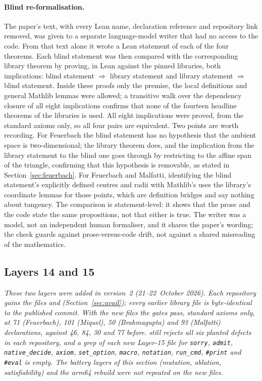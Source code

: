 \documentclass[11pt]{article}
\theoremstyle{definition}
\theoremstyle{remark}
\newcommand{\lean}[1]{\texttt{#1}}
\begin{document}
\paragraph{Blind re-formalisation.} The paper's text, with every Lean name, declaration
reference and repository link removed, was given to a separate language-model writer that had no
access to the code. From that text alone it wrote a Lean statement of each of the four theorems.
Each blind statement was then compared with the corresponding library theorem by proving, in Lean
against the pinned libraries, both implications: blind statement $\Rightarrow$ library statement
and library statement $\Rightarrow$ blind statement. Inside these proofs only the premise, the
local definitions and general Mathlib lemmas were allowed; a transitive walk over the dependency
closure of all eight implications confirms that none of the fourteen headline theorems of the
libraries is used. All eight implications were proved, from the standard axioms only, so all four
pairs are equivalent. Two points are worth recording. For Feuerbach the blind statement has no
hypothesis that the ambient space is two-dimensional; the library theorem does, and the implication
from the library statement to the blind one goes through by restricting to the affine span of the
triangle, confirming that this hypothesis is removable, as stated in Section~\ref{sec:feuerbach}.
For Feuerbach and Malfatti, identifying the blind statement's explicitly defined centres and radii
with Mathlib's uses the library's coordinate lemmas for those points, which are definition bridges
and say nothing about tangency. The comparison is statement-level: it shows that the prose and the
code state the same propositions, not that either is true. The writer was a model, not an
independent human formaliser, and it shares the paper's wording; the check guards against
prose-versus-code drift, not against a shared misreading of the mathematics.

\subsection{Layers 14 and 15}\label{sec:l1415}

\emph{These two layers were added in version~2 (21--22~October 2026). Each repository gains the files
 and  (Section~\ref{sec:avail}); every earlier library
file is byte-identical to the published commit. With the new files the gates pass, standard axioms only,
at 71 (Feuerbach), 101 (Miquel), 50 (Brahmagupta) and 93 (Malfatti) declarations, against 46, 84, 30 and
77 before.  still rejects all six planted defects in each repository, and a grep of
each new Layer-15 file for \lean{sorry}, \lean{admit}, \lean{native\_decide}, \lean{axiom},
\lean{set\_option}, \lean{macro}, \lean{notation}, \lean{run\_cmd}, \lean{\#print} and \lean{\#eval}
is empty. The battery layers of this section (mutation, ablation, satisfiability) and the arm64
rebuild were not repeated on the new files.}
\end{document}
